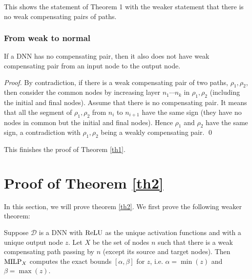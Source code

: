 This shows the statement of Theorem 1 with the weaker statement that there is no weak compensating pairs of paths.

	
	
	\subsubsection*{From weak to normal}
	
	\begin{lemma}
		If a DNN has no compensating pair, then it also does not have weak compensating pair from an input node to the output node.
	\end{lemma}
	
	\begin{proof}
		By contradiction, if there is a weak compensating pair of two paths, $\rho_1,\rho_2$, 
		then consider the common nodes by increasing layer $n_1 \cdots n_k$ in $\rho_1,\rho_2$ (including the initial and final nodes).
		Assume that there is no compensating pair.
		It means that all the segment of $\rho_1,\rho_2$ from $n_i$ to $n_{i+1}$ have the same sign (they have no nodes in common but the initial and final nodes).
		Hence $\rho_1$ and $\rho_2$ have the same sign, a contradiction with $\rho_1,\rho_2$ being a weakly compensating pair.  \qed
	\end{proof}
	
	This finishes the proof of Theorem \ref{th1}.
	
	












	\newpage

	





			
\section{Proof of Theorem \ref{th2}}
			
			In this section, we will prove theorem \ref{th2}. We first prove the following weaker theorem:
			
			\begin{theorem} \label{thm:2}
				
				
				Suppose $\mathcal{D}$ is a DNN with $\mathrm{ReLU}$ as the unique activation functions and with a unique output node $z$. 
				Let $X$ be the set of nodes $n$ such that there is a weak compensating path 
				passing by $n$ (except its source and target nodes).
				Then ${\textrm{MILP}}_X$ computes the exact bounds $[\alpha,\beta]$ for $z$,
				i.e. $\alpha=\min(z)$ and $\beta=\max(z)$.
			\end{theorem}
			
